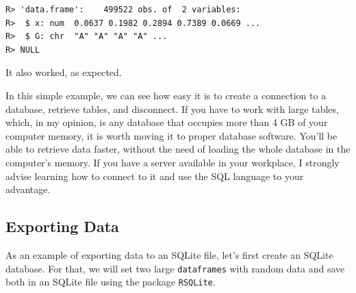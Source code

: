 \documentclass[
  12pt,
]{book}
\begin{document}
\begin{verbatim}
R> 'data.frame':    499522 obs. of  2 variables:
R>  $ x: num  0.0637 0.1982 0.2894 0.7389 0.0669 ...
R>  $ G: chr  "A" "A" "A" "A" ...
R> NULL
\end{verbatim}

It also worked, as expected.

In this simple example, we can see how easy it is to create a connection to a database, retrieve tables, and disconnect. If you have to work with large tables, which, in my opinion, is any database that occupies more than 4 GB of your computer memory, it is worth moving it to proper database software. You'll be able to retrieve data faster, without the need of loading the whole database in the computer's memory. If you have a server available in your workplace, I strongly advise learning how to connect to it and use the SQL language to your advantage.

\hypertarget{exporting-data-4}{%
\subsection{Exporting Data}\label{exporting-data-4}}

As an example of exporting data to an SQLite file, let's first create an SQLite database. For that, we will set two large \texttt{dataframes} with random data and save both in an SQLite file using the package \texttt{RSQLite}. 
\end{document}

